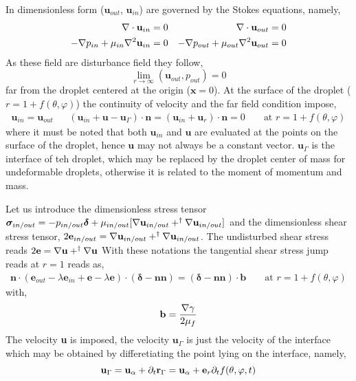 In dimensionless form ($\textbf{u}_{out}$, $\textbf{u}_{in}$) are governed by the Stokes equations, namely, 
\begin{align}
    \mathbf{\nabla}\cdot \textbf{u}_{in} = 0 
    && \mathbf{\nabla}\cdot \textbf{u}_{out} = 0 \\
    -\mathbf{\nabla} p_{in} + \mu_{in}\mathbf{\nabla}^2 \textbf{u}_{in}  = 0 
    &&-\mathbf{\nabla} p_{out} + \mu_{out}\mathbf{\nabla}^2 \textbf{u}_{out}  = 0 
\end{align}
As these field are disturbance field they follow,
\begin{equation}
    \lim_{r\to \infty}(\textbf{u}_{out},p_{out}) = 0 
\end{equation}
far from the droplet centered at the origin ($\textbf{x} = 0$). 
At the surface of the droplet ($r = 1 + f(\theta,\varphi)$) the continuity of velocity and the far field condition impose, 
\begin{align}
    \textbf{u}_{in} = \textbf{u}_{out}
    && 
    (\textbf{u}_{in}  + \textbf{u} - \textbf{u}_\Gamma)\cdot \textbf{n}
    = (\textbf{u}_{in}  + \textbf{u}_r)\cdot \textbf{n}
    = 0
    &&
    \text{ at }
    r = 1 + f(\theta,\varphi)
\end{align}
where it must be noted that both $\textbf{u}_{in}$ and $\textbf{u}$ are evaluated at the points on the surface of the droplet, hence $\textbf{u}$ may not always be a constant vector. 
$\textbf{u}_\Gamma$ is the interface of teh droplet, which may be replaced by the droplet center of mass for undeformable droplets, otherwise it is related to the moment of momentum and mass. 


Let us introduce the dimensionless stress tensor $\bm\sigma_{in/out} = -p_{in/out} \bm\delta + \mu_{in/out}[\mathbf{\nabla} \textbf{u}_{in/out} + ^\dagger \mathbf{\nabla} \textbf{u}_{in/out}]$ and the dimensionless shear stress tensor, $2\textbf{e}_{in/out} = \mathbf{\nabla} \textbf{u}_{in/out} + ^\dagger \mathbf{\nabla} \textbf{u}_{in/out}$. 
The undisturbed shear stress reads  $2\textbf{e} = \mathbf{\nabla} \textbf{u} + ^\dagger \mathbf{\nabla} \textbf{u}$
With these notations the tangential shear stress jump reads at $r = 1$ reads as, 
\begin{align}
    \mathbf{n}\cdot (\textbf{e}_{out} - \lambda \textbf{e}_{in}+\textbf{e} -\lambda\textbf{e})\cdot (\bm\delta - \textbf{nn})
    = (\bm\delta - \textbf{nn})\cdot \textbf{b}
    &&
    \text{ at }
    r = 1 + f(\theta,\varphi)
\end{align}
with, 
\begin{equation}
    \textbf{b}
    =
    \frac{\mathbf{\nabla} \gamma}{2\mu_f}
\end{equation}
The velocity \textbf{u} is imposed, the velocity $\textbf{u}_\Gamma$ is just the velocity of the interface which may be obtained by differetiating the point lying on the interface, namely, 
\begin{equation}
    \textbf{u}_\Gamma
    =
    \textbf{u}_\alpha
    +
    \partial_t \textbf{r}_\Gamma
    =
    \textbf{u}_\alpha
    + 
    \textbf{e}_r\partial_t f(\theta,\varphi,t)
\end{equation}

